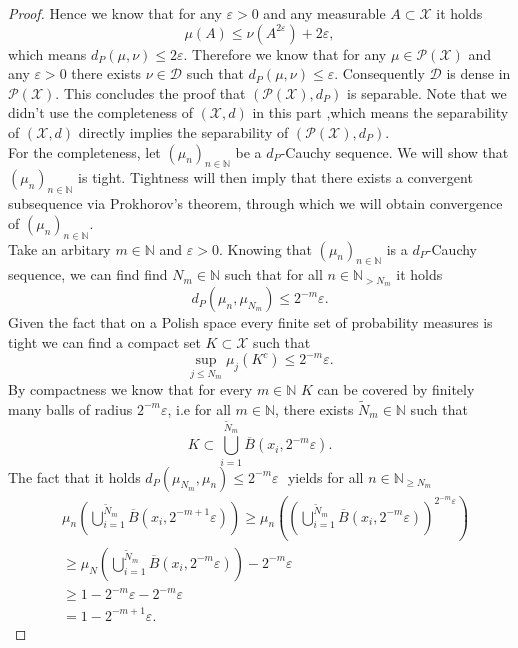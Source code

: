 \documentclass[11pt,a4paper]{article}
\begin{document}
\begin{proof}
Hence we know that for any $\varepsilon>0$ and any measurable $A\subset\mathcal{X}$ it holds 
\[
\mu(A)\leq\nu(A^{2\varepsilon})+2\varepsilon,
\]
which means $d_P(\mu,\nu)\leq{}2\varepsilon$. Therefore we know that for any $\mu\in\mathcal{P(X)}$ and any $\varepsilon>0$ there exists $\nu\in\mathcal{D}$ such that $d_P(\mu,\nu)\leq{}\varepsilon$. Consequently $\mathcal{D}$ is dense in $\mathcal{P(X)}$. This concludes the proof that $(\mathcal{P(X)},d_P)$ is separable. Note that we didn't use the completeness of $(\mathcal{X},d)$ in this part ,which means the separability of $(\mathcal{X},d)$ directly implies the separability of $(\mathcal{P(X)},d_P).$ \vspace{1em}\\
For the completeness, let $(\mu_n)_{n\in\mathbb{N}}$ be a $d_P$-Cauchy sequence. We will show that $(\mu_n)_{n\in\mathbb{N}}$ is tight. Tightness will then imply that there exists a convergent subsequence via Prokhorov's theorem, through which we will obtain convergence of $(\mu_n)_{n\in\mathbb{N}}$.\vspace{1em}\\
Take an arbitary $m\in\mathbb{N}$ and $\varepsilon>0$. Knowing that $(\mu_n)_{n\in\mathbb{N}}$ is a $d_P$-Cauchy sequence, we can find find $N_m\in\mathbb{N}$ such that for all $n\in\mathbb{N}_{>N_m}$ it holds
\[
d_P(\mu_n,\mu_{N_m})\leq{}2^{-m}\varepsilon.
\]
Given the fact that on a Polish space every finite set of probability measures is tight we can find a compact set $K\subset\mathcal{X}$ such that 
\[
\sup\limits_{j\leq{}N_m}\mu_j(K^c)\leq{}2^{-m}\varepsilon.
\]
By compactness we know that for every $m\in\mathbb{N}$ $K$ can be covered by finitely many balls of radius $2^{-m}\varepsilon$, i.e for all $m\in\mathbb{N}$, there exists $\tilde{N}_m\in\mathbb{N}$ such that
\[
K\subset\bigcup\limits_{i=1}^{\tilde{N}_m}\overline{B}(x_i,2^{-m}\varepsilon).
\]
The fact that it holds $d_P(\mu_{N_m},\mu_n)\leq{}2^{-m}\varepsilon\,\,$ yields for all $n\in\mathbb{N}_{\geq{N_m}}$
\begin{align*}
& \mu_n\left(\bigcup\limits_{i=1}^{\tilde{N}_m}\overline{B}(x_i,2^{-m+1}\varepsilon)\right) \geq \mu_n\left(\left(\bigcup\limits_{i=1}^{\tilde{N}_m}\overline{B}(x_i,2^{-m}\varepsilon)\right)^{2^{-m}\varepsilon}\right) \\[4pt]& \geq \mu_N\left(\bigcup\limits_{i=1}^{\tilde{N}_m}\overline{B}(x_i,2^{-m}\varepsilon)\right)-2^{-m}\varepsilon \\[8pt] &\geq 1-2^{-m}\varepsilon-2^{-m}\varepsilon \\[10pt]& = 1-2^{-m+1}\varepsilon.

\end{align*}
\end{proof}
\end{document}
